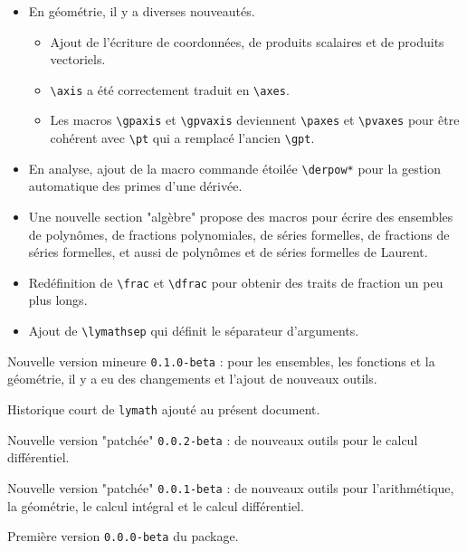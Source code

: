 \documentclass[12pt,a4paper]{article}
\theoremstyle{definition}
\begin{document}
\begin{description}[leftmargin=1em]
\begin{itemize}
		\item En géométrie, il y a diverses nouveautés.
		\begin{itemize}
			\item Ajout de l'écriture de coordonnées, de produits scalaires et de produits vectoriels.

			\item \verb+\axis+ a été correctement traduit en \verb+\axes+.

			\item Les macros \verb+\gpaxis+ et \verb+\gpvaxis+ deviennent \verb+\paxes+ et \verb+\pvaxes+ pour être cohérent avec \verb+\pt+ qui a remplacé l'ancien \verb+\gpt+.
		\end{itemize}

		\item En analyse, ajout de la macro commande étoilée \verb+\derpow*+ pour la gestion automatique des primes d'une dérivée.

		\item Une nouvelle section "algèbre" propose des macros pour écrire des ensembles de polynômes, de fractions polynomiales, de séries formelles, de fractions de séries formelles, et aussi de polynômes et de séries formelles de Laurent.

		\item Redéfinition de \verb+\frac+ et \verb+\dfrac+ pour obtenir des traits de fraction un peu plus longs.

		\item Ajout de \verb+\lymathsep+ qui définit le séparateur d'arguments.
	\end{itemize}


	\item[2017-11-01] Nouvelle version mineure \verb+0.1.0-beta+ : pour les ensembles, les fonctions et la géométrie, il y a eu des changements et l'ajout de nouveaux outils.


	\item[2017-10-21] Historique court de \verb+lymath+ ajouté au présent document.


	\item[2017-10-18] Nouvelle version "patchée" \verb+0.0.2-beta+ : de nouveaux outils pour le calcul différentiel.


	\item[2017-10-06] Nouvelle version "patchée" \verb+0.0.1-beta+ : de nouveaux outils pour l'arithmétique, la géométrie, le calcul intégral et le calcul différentiel.


	\item[2017-10-02] Première version \verb+0.0.0-beta+ du package.
\end{description}
\end{document}
